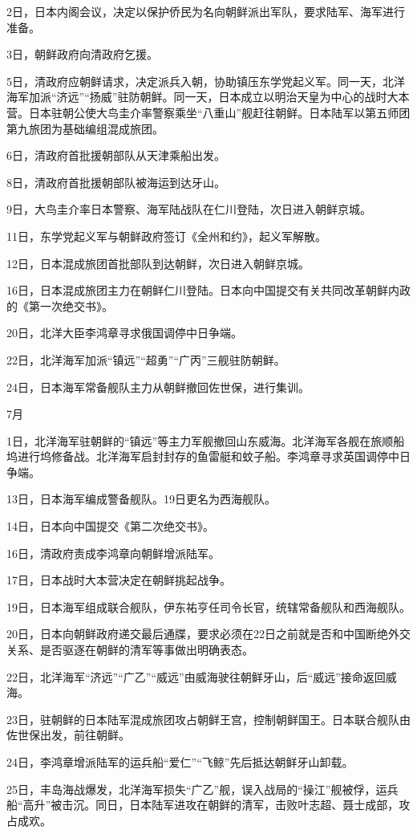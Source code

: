 \documentclass[12pt,UTF8]{ctexbook}
\begin{document}
2日，日本内阁会议，决定以保护侨民为名向朝鲜派出军队，要求陆军、海军进行准备。

3日，朝鲜政府向清政府乞援。

5日，清政府应朝鲜请求，决定派兵入朝，协助镇压东学党起义军。同一天，北洋海军加派“济远”“扬威”驻防朝鲜。同一天，日本成立以明治天皇为中心的战时大本营。日本驻朝公使大鸟圭介率警察乘坐“八重山”舰赶往朝鲜。日本陆军以第五师团第九旅团为基础编组混成旅团。

6日，清政府首批援朝部队从天津乘船出发。

8日，清政府首批援朝部队被海运到达牙山。

9日，大鸟圭介率日本警察、海军陆战队在仁川登陆，次日进入朝鲜京城。

11日，东学党起义军与朝鲜政府签订《全州和约》，起义军解散。

12日，日本混成旅团首批部队到达朝鲜，次日进入朝鲜京城。

16日，日本混成旅团主力在朝鲜仁川登陆。日本向中国提交有关共同改革朝鲜内政的《第一次绝交书》。

20日，北洋大臣李鸿章寻求俄国调停中日争端。

22日，北洋海军加派“镇远”“超勇”“广丙”三舰驻防朝鲜。

24日，日本海军常备舰队主力从朝鲜撤回佐世保，进行集训。

7月

1日，北洋海军驻朝鲜的“镇远”等主力军舰撤回山东威海。北洋海军各舰在旅顺船坞进行坞修备战。北洋海军启封封存的鱼雷艇和蚊子船。李鸿章寻求英国调停中日争端。

13日，日本海军编成警备舰队。19日更名为西海舰队。

14日，日本向中国提交《第二次绝交书》。

16日，清政府责成李鸿章向朝鲜增派陆军。

17日，日本战时大本营决定在朝鲜挑起战争。

19日，日本海军组成联合舰队，伊东祐亨任司令长官，统辖常备舰队和西海舰队。

20日，日本向朝鲜政府递交最后通牒，要求必须在22日之前就是否和中国断绝外交关系、是否驱逐在朝鲜的清军等事做出明确表态。

22日，北洋海军“济远”“广乙”“威远”由威海驶往朝鲜牙山，后“威远”接命返回威海。

23日，驻朝鲜的日本陆军混成旅团攻占朝鲜王宫，控制朝鲜国王。日本联合舰队由佐世保出发，前往朝鲜。

24日，李鸿章增派陆军的运兵船“爱仁”“飞鲸”先后抵达朝鲜牙山卸载。

25日，丰岛海战爆发，北洋海军损失“广乙”舰，误入战局的“操江”舰被俘，运兵船“高升”被击沉。同日，日本陆军进攻在朝鲜的清军，击败叶志超、聂士成部，攻占成欢。
\end{document}

